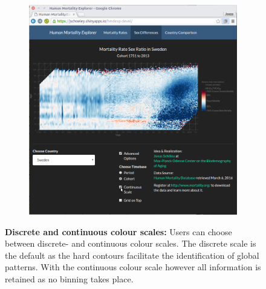 \documentclass[
  12pt
]{scrartcl}
\begin{document}
\begin{figure}[!htb]
\begin{subfigure}[t]{0.5\textwidth}
    \includegraphics[width = \textwidth]{./fig/hmd_screen_cont_col.png}
    \label{fig:mx_cont}
    \end{subfigure}%
    \caption*{\textbf{Discrete and continuous colour scales:} Users can choose between discrete- and continuous colour scales. The discrete scale is the default as the hard contours facilitate the identification of global patterns. With the continuous colour scale however all information is retained as no binning takes place.}
    \label{fig:mx_scales}
\end{figure}
\end{document}

